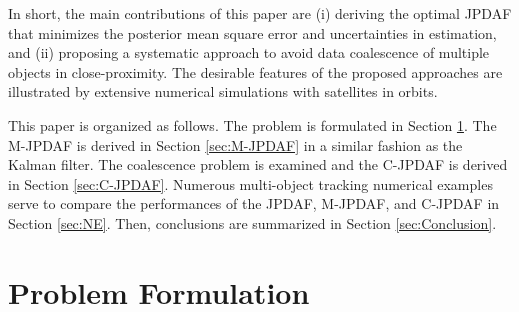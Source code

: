 In short, the main contributions of this paper are (i) deriving the optimal JPDAF that minimizes the posterior mean square error and uncertainties in estimation, and (ii) proposing a systematic approach to avoid data coalescence of multiple objects in close-proximity. The desirable features of the proposed approaches are illustrated by extensive numerical simulations with satellites in orbits.

This paper is organized as follows.
The problem is formulated in Section \ref{sec:PF}.
The M-JPDAF is derived in Section \ref{sec:M-JPDAF} in a similar fashion as the Kalman filter.
The coalescence problem is examined and the C-JPDAF is derived in Section \ref{sec:C-JPDAF}.
Numerous multi-object tracking numerical examples serve to compare the performances of the JPDAF, M-JPDAF, and C-JPDAF in Section \ref{sec:NE}.
Then, conclusions are summarized in Section \ref{sec:Conclusion}.




\section{Problem Formulation}
\label{sec:PF}
%
%

%

